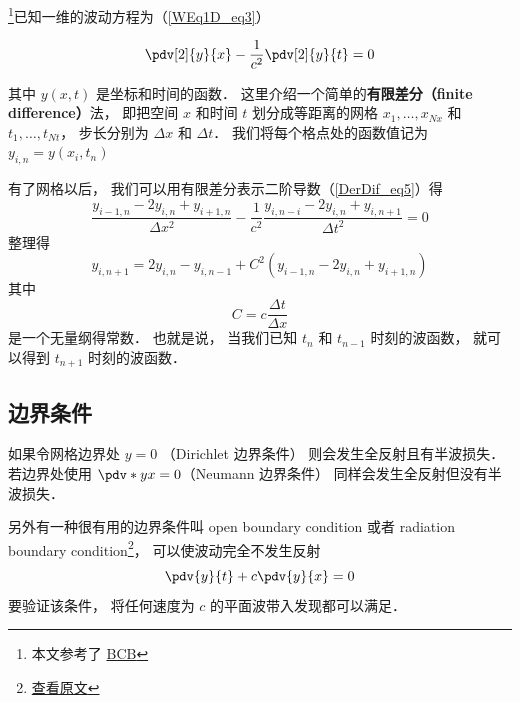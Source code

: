 

\footnote{本文参考了 \href{http://hplgit.github.io/num-methods-for-PDEs/doc/pub/wave/sphinx/._main_wave001.html\#discretizing-the-domain}{BCB}}已知一维的波动方程为（\autoref{WEq1D_eq3}）

\begin{equation}
\pdv[2]{y}{x} - \frac{1}{c^2}\pdv[2]{y}{t} = 0
\end{equation}

其中 $y(x, t)$ 是坐标和时间的函数． 这里介绍一个简单的\textbf{有限差分（finite difference）}法， 即把空间 $x$ 和时间 $t$ 划分成等距离的网格 $x_1, \dots, x_{Nx}$ 和 $t_1, \dots, t_{Nt}$， 步长分别为 $\Delta x$ 和 $\Delta t$． 我们将每个格点处的函数值记为 $y_{i,n} = y(x_i, t_n)$

有了网格以后， 我们可以用有限差分表示二阶导数（\autoref{DerDif_eq5}）得
\begin{equation}
\frac{y_{i-1,n} - 2y_{i,n} + y_{i+1,n}}{\Delta x^2} - \frac{1}{c^2} \frac{y_{i, n-i} - 2y_{i, n} + y_{i, n+1}}{\Delta t^2} = 0
\end{equation}
整理得
\begin{equation}
y_{i, n+1} = 2y_{i, n} - y_{i, n-1} + C^2(y_{i-1,n} - 2y_{i,n} + y_{i+1,n})
\end{equation}
其中
\begin{equation}
C = c \frac{\Delta t}{\Delta x}
\end{equation}
是一个无量纲得常数． 也就是说， 当我们已知 $t_n$ 和 $t_{n-1}$ 时刻的波函数， 就可以得到 $t_{n+1}$ 时刻的波函数．

\subsection{边界条件}
如果令网格边界处 $y = 0$ （Dirichlet 边界条件） 则会发生全反射且有半波损失． 若边界处使用 $\pdv*{y}{x} = 0$（Neumann 边界条件） 同样会发生全反射但没有半波损失．

另外有一种很有用的边界条件叫 open boundary condition 或者 radiation boundary condition\footnote{\href{http://hplgit.github.io/num-methods-for-PDEs/doc/pub/wave/sphinx/._main_wave003.html\#problem-11-implement-open-boundary-conditions}{查看原文}}， 可以使波动完全不发生反射
\begin{equation}
\pdv{y}{t} + c\pdv{y}{x} = 0
\end{equation}
要验证该条件， 将任何速度为 $c$ 的平面波带入发现都可以满足．

